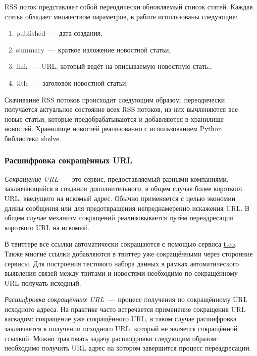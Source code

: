         RSS поток представляет собой переодически обновляемый список статей. Каждая статья обладает множеством параметров, в работе использованы следующие:
        \begin{enumerate}
            \item published~---~дата создания,
            \item summary~---~краткое изложение новостной статьи,
            \item link~---~URL, который ведёт на описываемую новостную стать.,
            \item title~---~заголовок новостной статьи,
        \end{enumerate}

        Скачивание RSS потоков происходит следующим образом: переодически получается актуальное состояние всех RSS потоков, из них вычленяются все новые статьи,
        которые предобрабатываются и добавляются в хранилище новостей. Хранилище новостей реализованно с использованием Python библиотеки shelve.

    \subsubsection{Расшифровка сокращённых URL}
        \textit{Сокращение URL}~---~это сервис, предоставляемый разными компаниями, заключающийся в создании дополнительного, в общем случае более короткого URL, введущего на искомый адрес.
        Обычно применяется с целью экономии длины сообщения или для предотвращения непреднамеренно искажения URL.
        В общем случае механизм сокращений реализовывается путём переадресации короткого URL на искомый.

        В твиттере все ссылки автоматически сокращаются с помощью сервиса \url{t.co}. Также многие ссылки добавляются в твиттер уже сокращёнными через сторонние сервисы.
        Для построения тестового набора данных в рамках автоматического выявления связей между твитами и новостями необходимо по сокращённому URL получать исходный.

        \textit{Расшифровка сокращённых URL}~---~процесс получения по сокращённому URL исходного адреса.
        На практике часто встречается применение сокращения URL каскадом: сокращение уже сокращённого URL,
        в таком случае расшифровка заключается в получении исходного URL, который не является сокращённой ссылкой.
        Можно трактовать задачу расшифровки следующим образом: необходимо получить URL адрес на котором завершится процесс переадресации.

